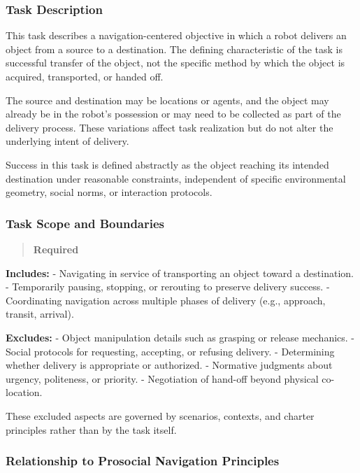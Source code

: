 \documentclass[utf8]{frontiers_suppmat} %
\begin{document}
\subsubsection{Task Description}\label{task-description}

This task describes a navigation-centered objective in which a robot
delivers an object from a source to a destination. The defining
characteristic of the task is successful transfer of the object, not the
specific method by which the object is acquired, transported, or handed
off.

The source and destination may be locations or agents, and the object
may already be in the robot's possession or may need to be collected as
part of the delivery process. These variations affect task realization
but do not alter the underlying intent of delivery.

Success in this task is defined abstractly as the object reaching its
intended destination under reasonable constraints, independent of
specific environmental geometry, social norms, or interaction protocols.

\subsubsection{Task Scope and Boundaries}\label{task-scope-and-boundaries}

\begin{quote}
\textbf{Required}
\end{quote}

\textbf{Includes:} - Navigating in service of transporting an object
toward a destination. - Temporarily pausing, stopping, or rerouting to
preserve delivery success. - Coordinating navigation across multiple
phases of delivery (e.g., approach, transit, arrival).

\textbf{Excludes:} - Object manipulation details such as grasping or
release mechanics. - Social protocols for requesting, accepting, or
refusing delivery. - Determining whether delivery is appropriate or
authorized. - Normative judgments about urgency, politeness, or
priority. - Negotiation of hand-off beyond physical co-location.

These excluded aspects are governed by scenarios, contexts, and charter
principles rather than by the task itself.

\subsubsection{Relationship to Prosocial Navigation
Principles}\label{relationship-to-prosocial-navigation-principles}
\end{document}
